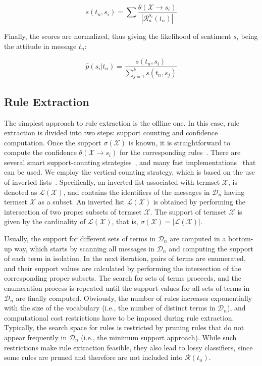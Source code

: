 \begin{equation} \label{eq1}
s(t_n, s_i)=\displaystyle\sum \displaystyle\frac{\theta(\mathcal{X}\xrightarrow{}s_i)}{|\mathcal{R}^{s_i}_a(t_n)|}
\end{equation}

Finally, the scores are normalized, thus giving the likelihood of sentiment $s_i$ being the attitude in message $t_n$:

\begin{equation}
\label{eq:prob}
\hat{p}(s_i|t_n)=\displaystyle\frac{s(t_n, s_i)}{\displaystyle\sum^{k}_{j=1} s(t_n, s_j)}
\end{equation}

\subsection*{Rule Extraction}

The simplest approach to rule extraction is the offline one. In this case, rule extraction is divided into two steps: support counting and confidence computation. Once the support $\sigma(\mathcal{X})$ is known, it is straightforward to compute the confidence $\theta(\mathcal{X}\xrightarrow{}s_i)$ for the corresponding rules~\cite{eclat}.
There are several smart support-counting strategies~\cite{rules,fp,eclat}, and many fast implementations~\cite{fimi} that can be used.
We employ the vertical counting strategy, which is based on the use of inverted lists~\cite{vertical}.
Specifically, an inverted list associated with termset $\mathcal{X}$, is denoted as $\mathcal{L}(\mathcal{X})$, and contains the identifiers of the messages in $\mathcal{D}_n$ having termset $\mathcal{X}$ as a subset. An inverted list $\mathcal{L}(\mathcal{X})$ is obtained by performing the intersection of two proper subsets of termset $\mathcal{X}$. The support of termset $\mathcal{X}$ is given by the cardinality of $\mathcal{L}(\mathcal{X})$, that is, $\sigma(\mathcal{X})=|\mathcal{L}(\mathcal{X})|$.

Usually, the support for different sets of terms in $\mathcal{D}_n$ are computed in a bottom-up way, which
starts by scanning all messages in $\mathcal{D}_n$
and computing the support of each term in isolation.
In the next iteration,
pairs of terms are enumerated, and their support values are calculated by performing the intersection of the corresponding proper subsets.
The search for sets of terms proceeds, and the enumeration process is repeated until the support values for all sets of terms in $\mathcal{D}_n$ are finally computed.
Obviously, the number of rules increases exponentially with the size of the vocabulary (i.e., the number of distinct terms in $\mathcal{D}_n$), and
computational cost restrictions have to be imposed during
rule extraction. Typically, the search space for rules is restricted by pruning
rules that do not appear frequently in $\mathcal{D}_n$ (i.e., the minimum support approach). While such restrictions make rule extraction feasible, they also lead to lossy classifiers, since some rules are pruned and therefore are not included into $\mathcal{R}(t_n)$.

